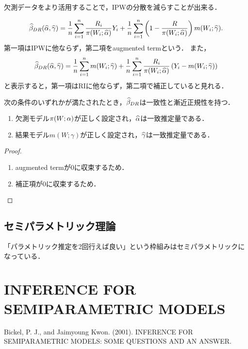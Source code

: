 \documentclass[uplatex,dvipdfmx]{jsreport}
\begin{document}
欠測データをより活用することで，IPWの分散を減らすことが出来る．

\[\widehat{\beta}_{DR}(\widehat{\alpha},\widehat{\gamma})=\frac{1}{n}\sum^n_{i=1}\frac{R_i}{\pi(W_i;\widehat{\alpha})}Y_i+\frac{1}{n}\sum^n_{i=1}\left(1-\frac{R}{\pi(W_i;\widehat{\alpha})}\right)m(W_i;\widehat{\gamma}).\]
第一項はIPWに他ならず，第二項をaugmented termという．
また，
\[\widehat{\beta}_{DR}(\widehat{\alpha},\widehat{\gamma})=\frac{1}{n}\sum^n_{i=1}m(W_i;\widehat{\gamma})+\frac{1}{n}\sum^n_{i=1}\frac{R_i}{\pi(W_i;\widehat{\alpha})}\left(Y_i-m(W_i;\widehat{\gamma})\right)\]
と表示すると，第一項はRIに他ならず，第二項で補正していると見れる．

\begin{theorem}[2重ロバスト性]
    次の条件のいずれかが満たされたとき，$\widehat{\beta}_{DR}$は一致性と漸近正規性を持つ．
    \begin{enumerate}
        \item 欠測モデル$\pi(W;\alpha)$が正しく設定され，$\widehat{\alpha}$は一致推定量である．
        \item 結果モデル$m(W;\gamma)$が正しく設定され，$\widehat{\gamma}$は一致推定量である．
    \end{enumerate}
\end{theorem}
\begin{proof}\mbox{}
    \begin{enumerate}
        \item augmented termが$0$に収束するため．
        \item 補正項が$0$に収束するため．
    \end{enumerate}
\end{proof}

\subsection{セミパラメトリック理論}

\begin{tcolorbox}[colframe=ForestGreen, colback=ForestGreen!10!white,breakable,colbacktitle=ForestGreen!40!white,coltitle=black,fonttitle=\bfseries\sffamily,
title=]
    「パラメトリック推定を2回行えば良い」という枠組みはセミパラメトリックになっている．
\end{tcolorbox}

\section{INFERENCE FOR SEMIPARAMETRIC MODELS}

\begin{tcolorbox}[colframe=ForestGreen, colback=ForestGreen!10!white,breakable,colbacktitle=ForestGreen!40!white,coltitle=black,fonttitle=\bfseries\sffamily,
title=]
    Bickel, P. J., and Jaimyoung Kwon. (2001). INFERENCE FOR SEMIPARAMETRIC MODELS: SOME QUESTIONS AND AN ANSWER.
\end{tcolorbox}
\end{document}

